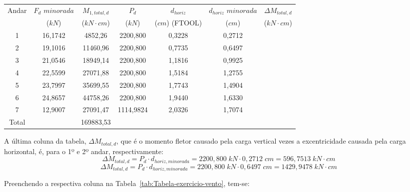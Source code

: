 \begin{table}[H]
\centering
\begin{tabular}{c|c|c|ccc|c}
\hline
Andar & $F_d$ $minorada$ & $M_{1, total, d}$ & \multicolumn{1}{c|}{$P_d$} & \multicolumn{1}{c|}{$d_{horiz}$} & $d_{horiz}$ $minorada$ & $\Delta M_{total, d}$ \\
 & ($kN$) & ($kN\cdot cm$) & \multicolumn{1}{c|}{($kN$)} & \multicolumn{1}{c|}{($cm$) (FTOOL)} & ($cm$) & ($kN\cdot cm$) \\ \hline
1 & 16,1742 & 4852,26 & \multicolumn{1}{c|}{2200,800} & \multicolumn{1}{c|}{0,3228} & 0,2712 &  \\
2 & 19,1016 & 11460,96 & \multicolumn{1}{c|}{2200,800} & \multicolumn{1}{c|}{0,7735} & 0,6497 &  \\
3 & 21,0546 & 18949,14 & \multicolumn{1}{c|}{2200,800} & \multicolumn{1}{c|}{1,1816} & 0,9925 &  \\
4 & 22,5599 & 27071,88 & \multicolumn{1}{c|}{2200,800} & \multicolumn{1}{c|}{1,5184} & 1,2755 &  \\
5 & 23,7997 & 35699,55 & \multicolumn{1}{c|}{2200,800} & \multicolumn{1}{c|}{1,7743} & 1,4904 &  \\
6 & 24,8657 & 44758,26 & \multicolumn{1}{c|}{2200,800} & \multicolumn{1}{c|}{1,9440} & 1,6330 &  \\
7 & 12,9007 & 27091,47 & \multicolumn{1}{c|}{1114,9824} & \multicolumn{1}{c|}{2,0326} & 1,7074 &  \\ \hline
Total &  & 169883,53 &  &  &  &  \\ \cline{1-1} \cline{3-3} \cline{7-7} 
\end{tabular}
\end{table}

A última coluna da tabela, $\Delta M_{total, d}$, que é o momento fletor causado pela carga vertical vezes a excentricidade causada pela carga horizontal, é, para o 1º e 2º andar, respectivamente:
$$\Delta M_{total, d}=P_d\cdot d_{horiz, minorada}=2200,800\;kN\cdot0,2712\;cm=596,7513\;kN\cdot cm$$
$$\Delta M_{total, d}=P_d\cdot d_{horiz, minorada}=2200,800\;kN\cdot0,6497\;cm=1429,9478\;kN\cdot cm$$

Preenchendo a respectiva coluna na Tabela~\ref{tab:Tabela-exercicio-vento}, tem-se:

